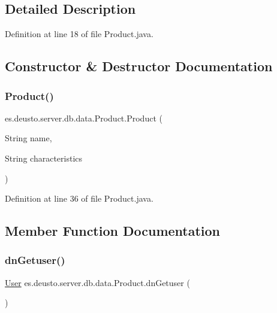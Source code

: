 \subsection{Detailed Description}


Definition at line 18 of file Product.\+java.



\subsection{Constructor \& Destructor Documentation}
\mbox{\label{classes_1_1deusto_1_1server_1_1db_1_1data_1_1_product_a8c697db6ce4cede760ae565dfde3ac3e}} 
\subsubsection{\texorpdfstring{Product()}{Product()}}
{\footnotesize\ttfamily es.\+deusto.\+server.\+db.\+data.\+Product.\+Product (\begin{DoxyParamCaption}\item[{String}]{name,  }\item[{String}]{characteristics }\end{DoxyParamCaption})}



Definition at line 36 of file Product.\+java.



\subsection{Member Function Documentation}
\mbox{\label{classes_1_1deusto_1_1server_1_1db_1_1data_1_1_product_a2e60d68bada56d93ec2ef5e67a0c3d9f}} 
\subsubsection{\texorpdfstring{dn\+Getuser()}{dnGetuser()}}
{\footnotesize\ttfamily \hyperlink{classes_1_1deusto_1_1server_1_1db_1_1data_1_1_user}{User} es.\+deusto.\+server.\+db.\+data.\+Product.\+dn\+Getuser (\begin{DoxyParamCaption}{ }\end{DoxyParamCaption})}



